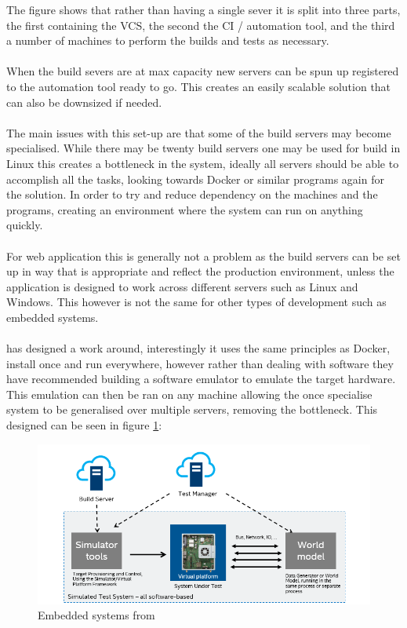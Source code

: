 The figure shows that rather than having a single sever it is split into three parts, the first containing the VCS, the second the CI / automation tool, and the third a number of machines to perform the builds and tests as necessary.
\\\\
When the build severs are at max capacity new servers can be spun up registered to the automation tool ready to go. This creates an easily scalable solution that can also be downsized if needed.
\\\\
The main issues with this set-up are that some of the build servers may become specialised. While there may be twenty build servers one may be used for build in Linux this creates a bottleneck in the system, ideally all servers should be able to accomplish all the tasks, looking towards Docker or similar programs again for the solution. In order to try and reduce dependency on the machines  and the programs, creating an environment where the system can run on anything quickly.
\\\\
For web application this is generally not a problem as the build servers can be set up in way  that is appropriate and reflect the production environment, unless the application is designed to work across different servers such as Linux and Windows. This however is not the same for other types of development such as embedded systems.
\\\\
\cite{intel} has designed a work around, interestingly it uses the same principles as Docker, install once and run everywhere, however rather than dealing with software they have recommended building a software emulator to emulate the target hardware. This emulation can then be ran on any machine allowing the once specialise system to be generalised over multiple servers, removing the bottleneck. This designed can be seen in figure \ref{fig:intel}:

\begin{figure}[H]
	\centering
	\includegraphics[scale=0.7]{images/intel.png}
	\caption{Embedded systems from \cite{intel}}
	\label{fig:intel}
\end{figure}

